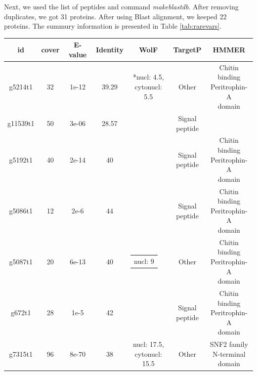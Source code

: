 \documentclass{article}
\makeatletter
\newcommand{\specialcell}[2][c]{%
	\begin{tabular}[#1]{@{}c@{}}#2\end{tabular}}
\makeatother
\begin{document}
 Next, we used the list of peptides and command \emph{makeblastdb}. After removing duplicates, we got 31 proteins. After using Blast alignment, we keeped 22 proteins. The summury information is presented in Table \ref*{tab:rarevars}.
 \begin{longtable}[H!]{|c|c|c|c|c|c|c|} 
  	\hline
 		id & cover &  	E-value	&  Identity & WolF & TargetP &	HMMER \\
 		 		\hline
 		g5214t1 & 32  &	1e-12 & 39.29 & \specialcell{*nucl: 4.5, \\ cytonucl: 5.5}  & Other & \specialcell{ Chitin binding \\Peritrophin-A \\ domain}  \\ 
	\hline
  		g11539t1 & 50  &	3e-06 & 28.57 & \specialcell{ }  & \specialcell{Signal \\ peptide} & \specialcell{  }  \\ 
 \hline
  		g5192t1 & 40  &		2e-14 & 40 & \specialcell{ }  & \specialcell{Signal \\ peptide} & \specialcell{Chitin binding \\
  			Peritrophin-A
  			\\ domain}  \\ 
 \hline
  		g5086t1 & 12  &	2e-6 & 44& \specialcell{ }  &   \specialcell{Signal \\ peptide}  & \specialcell{ Chitin binding \\Peritrophin-A \\ domain}  \\ 
 \hline
  		g5087t1 & 20  &	6e-13 & 40 & \specialcell{nucl: 9}  & Other & \specialcell{ Chitin binding \\Peritrophin-A \\ domain}  \\ 
 \hline
  		g672t1 & 28  &	1e-5 & 42 & \specialcell{ }  &  \specialcell{Signal \\ peptide}  & \specialcell{ Chitin binding \\Peritrophin-A \\ domain}  \\ 
 \hline
  		g7315t1 & 96  &	8e-70 & 38  & \specialcell{nucl: 17.5, \\ cytonucl: 15.5 }  & Other & \specialcell{ SNF2 family \\
  			N-terminal \\  
  			domain}  \\ 
 \hline
 

\end{longtable}
\end{document}
